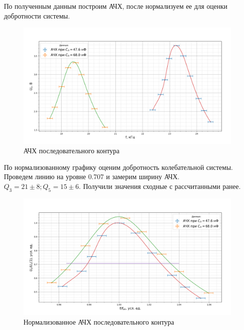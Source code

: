 \documentclass[a4paper, 12pt]{article}%
\begin{document}
	По полученным данным построим АЧХ, после нормализуем ее для оценки добротности системы.\\
	\begin{figure}[H]
		\centering
		\includegraphics[width=0.92\linewidth]{ачх}
		\caption{АЧХ последовательного контура}
		\label{fig:}
	\end{figure}
	По нормализованному графику оценим добротность колебательной системы. Проведем линию на уровне 0.707 и замерим ширину АЧХ. $Q_3 = 21 \pm 8; Q_5 = 15 \pm 6$. Получили значения сходные с рассчитанными ранее.
	\begin{figure}[H]
		\centering
		\includegraphics[width=0.92\linewidth]{ачх_норм}
		\caption{Нормализованное АЧХ последовательного контура}
		\label{fig:}
	\end{figure}
\end{document}
